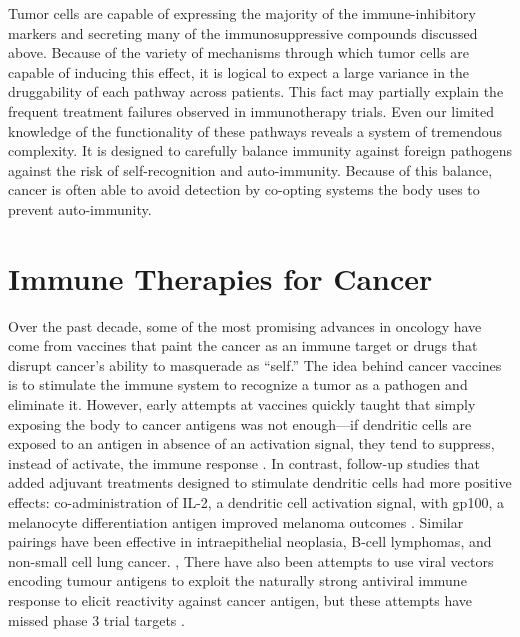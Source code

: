 Tumor cells are capable of expressing the majority of the immune-inhibitory markers and secreting many of the immunosuppressive compounds discussed above. 
Because of the variety of mechanisms through which tumor cells are capable of inducing this effect, it is logical to expect a large variance in the druggability of each pathway across patients. 
This fact may partially explain the frequent treatment failures observed in immunotherapy trials. 
Even our limited knowledge of the functionality of these pathways reveals a system of tremendous complexity. 
It is designed to carefully balance immunity against foreign pathogens against the risk of self-recognition and auto-immunity. 
Because of this balance, cancer is often able to avoid detection by co-opting systems the body uses to prevent auto-immunity. 

\section{Immune Therapies for Cancer}

Over the past decade, some of the most promising advances in oncology have come from vaccines that paint the cancer as an immune target or drugs that disrupt cancer’s ability to masquerade as ``self.'' 
The idea behind cancer vaccines is to stimulate the immune system to recognize a tumor as a pathogen and eliminate it. 
However, early attempts at vaccines quickly taught that simply exposing the body to cancer antigens was not enough---if dendritic cells are exposed to an antigen in absence of an activation signal, they tend to suppress, instead of activate, the immune response \citep{Rosenberg2004}. 
In contrast, follow-up studies that added adjuvant treatments designed to stimulate dendritic cells had more positive effects: 
co-administration of IL-2, a dendritic cell activation signal, with gp100, a melanocyte differentiation antigen improved melanoma outcomes \citep{Eberlein2012}. 
Similar pairings have been effective in intraepithelial neoplasia, B-cell lymphomas, and non-small cell lung cancer. \citep{Eberlein2012,Stockman2011}, 
There have also been attempts to use viral vectors encoding tumour antigens to exploit the naturally strong antiviral immune response to elicit reactivity against cancer antigen, but these attempts have missed phase 3 trial targets \citep{BavarianNordic2017}.

